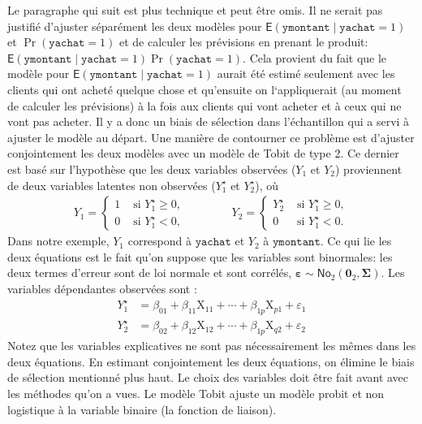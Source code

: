 \documentclass[
  11pt,
  letterpaper,
]{book}
\theoremstyle{definition}
\theoremstyle{remark}
\begin{document}
Le paragraphe qui suit est plus technique et peut être omis. Il ne
serait pas justifié d'ajuster séparément les deux modèles pour
\(\mathsf{E}(\texttt{ymontant} \mid \texttt{yachat}=1)\) et
\(\Pr(\texttt{yachat}=1)\) et de calculer les prévisions en prenant le
produit:
\(\mathsf{E}(\texttt{ymontant} \mid \texttt{yachat}=1)\Pr(\texttt{yachat}=1)\).
Cela provient du fait que le modèle pour
\(\mathsf{E}(\texttt{ymontant} \mid \texttt{yachat}=1)\) aurait été
estimé seulement avec les clients qui ont acheté quelque chose et
qu'ensuite on l`appliquerait (au moment de calculer les prévisions) à la
fois aux clients qui vont acheter et à ceux qui ne vont pas acheter. Il
y a donc un biais de sélection dans l'échantillon qui a servi à ajuster
le modèle au départ. Une manière de contourner ce problème est d'ajuster
conjointement les deux modèles avec un modèle de Tobit de type 2. Ce
dernier est basé sur l'hypothèse que les deux variables observées
(\(Y_1\) et \(Y_2\)) proviennent de deux variables latentes non
observées (\(Y_1^{\star}\) et \(Y_2^{\star}\)), où \begin{align*}
Y_1 = \begin{cases}
1 & \text{ si } Y_1^{\star} \ge 0, \\
0 & \text{ si } Y_1^{\star} < 0,
\end{cases}
\qquad \qquad 
Y_2 = \begin{cases}
Y_2^{\star} & \text{ si } Y_1^{\star} \ge 0, \\
0 & \text{ si } Y_1^{\star} < 0.
\end{cases}
\end{align*} Dans notre exemple, \(Y_1\) correspond à
\(\texttt{yachat}\) et \(Y_2\) à \(\texttt{ymontant}\). Ce qui lie les
deux équations est le fait qu'on suppose que les variables sont
binormales: les deux termes d'erreur sont de loi normale et sont
corrélés,
\(\boldsymbol{\varepsilon} \sim \mathsf{No}_2(\boldsymbol{0}_2, \boldsymbol{\Sigma})\).
Les variables dépendantes observées sont : \begin{align*}
Y_{1}^{\star} &= \beta_{01} + \beta_{11} \mathrm{X}_{11} + \cdots + \beta_{1p}\mathrm{X}_{p1} + \varepsilon_{1}\\
Y_{2}^{\star} &= \beta_{02} + \beta_{12} \mathrm{X}_{12} + \cdots + \beta_{1p}\mathrm{X}_{q2} + \varepsilon_{2}
\end{align*} Notez que les variables explicatives ne sont pas
nécessairement les mêmes dans les deux équations. En estimant
conjointement les deux équations, on élimine le biais de sélection
mentionné plus haut. Le choix des variables doit être fait avant avec
les méthodes qu'on a vues. Le modèle Tobit ajuste un modèle probit et
non logistique à la variable binaire (la fonction de liaison).
\end{document}
